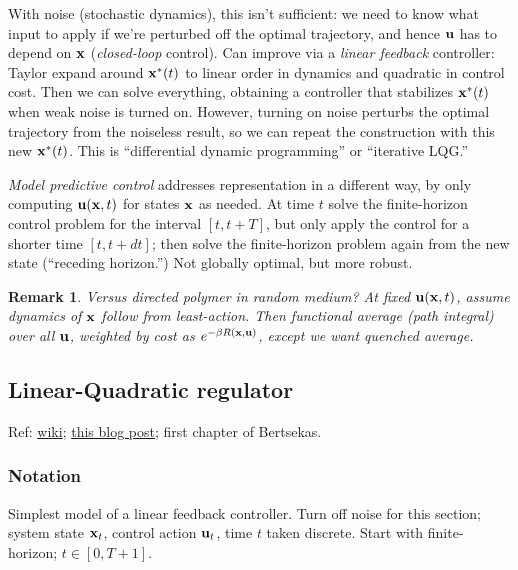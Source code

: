 \documentclass[notitlepage,openany,11pt]{report}
\theoremstyle{plain}%
\newtheorem{notethm}{Remark}
\newenvironment{notebox}
    {\noindent\colorlet{shadecolor}{cyan!15}\begin{shaded}\begin{notethm}}
    {\end{notethm}\end{shaded}}
\numberwithin{equation}{section}
\begin{document}
With noise (stochastic dynamics), this isn't sufficient: we need to know what input to apply if we're perturbed off the optimal trajectory, and hence $\mathbf{u}$ has to depend on $\mathbf{x}$ (\emph{closed-loop} control). Can improve via a \emph{linear feedback} controller: Taylor expand around $\mathbf{x}^{\ast}(t)$ to linear order in dynamics and quadratic in control cost. Then we can solve everything, obtaining a controller that stabilizes $\mathbf{x}^{\ast}(t)$ when weak noise is turned on. However, turning on noise perturbs the optimal trajectory from the noiseless result, so we can repeat the construction with this new $\mathbf{x}^{\ast}(t)$. This is ``differential dynamic programming'' or ``iterative LQG.''

\emph{Model predictive control} addresses representation in a different way, by only computing $\mathbf{u}(\mathbf{x},t)$ for states $\mathbf{x}$ as needed. At time $t$ solve the finite-horizon control problem for the interval  $[t, t+T]$, but only apply the control for a shorter time $[t, t+dt]$; then solve the finite-horizon problem again from the new state (``receding horizon.'') Not globally optimal, but more robust.

\begin{notebox}
Versus directed polymer in random medium? At fixed $\mathbf{u}(\mathbf{x},t)$, assume dynamics of $\mathbf{x}$ follow from least-action. Then functional average (path integral) over all $\mathbf{u}$, weighted by cost as $e^{-\beta R(\mathbf{x},\mathbf{u})}$, except we want quenched average.
\end{notebox}


\subsection{Linear-Quadratic regulator}

Ref: \href{https://en.wikipedia.org/wiki/Linear\%E2\%80\%93quadratic_regulator}{wiki}; \href{http://www.argmin.net/2018/02/08/lqr/}{this blog post}; first chapter of Bertsekas.

\subsubsection{Notation}

Simplest model of a linear feedback controller. Turn off noise for this section; system state $\mathbf{x}_{t}$, control action $\mathbf{u}_{t}$, time $t$ taken discrete. Start with finite-horizon; $t \in [0, T+1]$.
\end{document}
